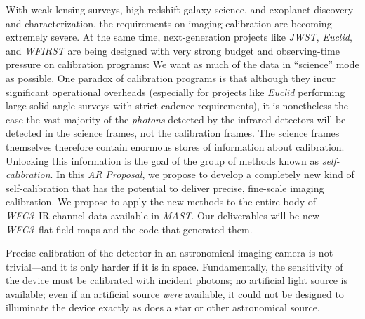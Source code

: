 \documentclass[12pt]{article}
\newcommand{\documentname}{\textsl{AR Proposal}}
\newcommand{\project}[1]{\textsl{#1}}
\newcommand{\WFC}{\project{WFC3}}
\newcommand{\MAST}{\project{MAST}}
\begin{document}
%
%
\justification          %

With weak lensing surveys, high-redshift galaxy science, and exoplanet
discovery and characterization, the requirements on imaging
calibration are becoming extremely severe.  At the same time,
next-generation projects like \project{JWST}, \project{Euclid}, and
\project{WFIRST} are being designed with very strong budget and
observing-time pressure on calibration programs: We want as much of
the data in ``science'' mode as possible.  One paradox of calibration
programs is that although they incur significant operational overheads
(especially for projects like \project{Euclid} performing large
solid-angle surveys with strict cadence requirements), it is
nonetheless the case the vast majority of the \emph{photons} detected
by the infrared detectors will be detected in the science frames, not
the calibration frames.  The science frames themselves therefore
contain enormous stores of information about calibration.  Unlocking
this information is the goal of the group of methods known as
\emph{self-calibration}.  In this \documentname, we propose to develop
a completely new kind of self-calibration that has the potential to
deliver precise, fine-scale imaging calibration.  We propose to apply
the new methods to the entire body of \WFC\ IR-channel data available
in \MAST.  Our deliverables will be new \WFC\ flat-field maps and the
code that generated them.

Precise calibration of the detector in an astronomical imaging camera
is not trivial---and it is only harder if it is in space.
Fundamentally, the sensitivity of the device must be calibrated with
incident photons; no artificial light source is available; even if an
artificial source \emph{were} available, it could not be designed to
illuminate the device exactly as does a star or other astronomical
source.
\end{document}
